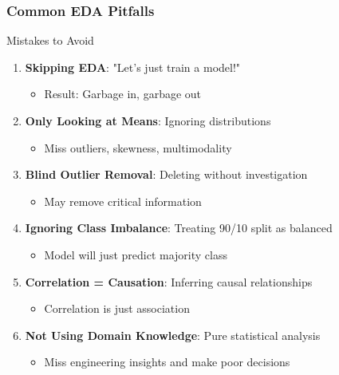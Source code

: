 \documentclass[aspectratio=169]{beamer}
\begin{document}
\begin{frame}
\frametitle{Common EDA Pitfalls}

\begin{block}{Mistakes to Avoid}
\begin{enumerate}
    \item \textbf{Skipping EDA}: "Let's just train a model!"
    \begin{itemize}
        \item Result: Garbage in, garbage out
    \end{itemize}

    \item \textbf{Only Looking at Means}: Ignoring distributions
    \begin{itemize}
        \item Miss outliers, skewness, multimodality
    \end{itemize}

    \item \textbf{Blind Outlier Removal}: Deleting without investigation
    \begin{itemize}
        \item May remove critical information
    \end{itemize}

    \item \textbf{Ignoring Class Imbalance}: Treating 90/10 split as balanced
    \begin{itemize}
        \item Model will just predict majority class
    \end{itemize}

    \item \textbf{Correlation = Causation}: Inferring causal relationships
    \begin{itemize}
        \item Correlation is just association
    \end{itemize}

    \item \textbf{Not Using Domain Knowledge}: Pure statistical analysis
    \begin{itemize}
        \item Miss engineering insights and make poor decisions
    \end{itemize}
\end{enumerate}
\end{block}

\end{frame}
\end{document}
